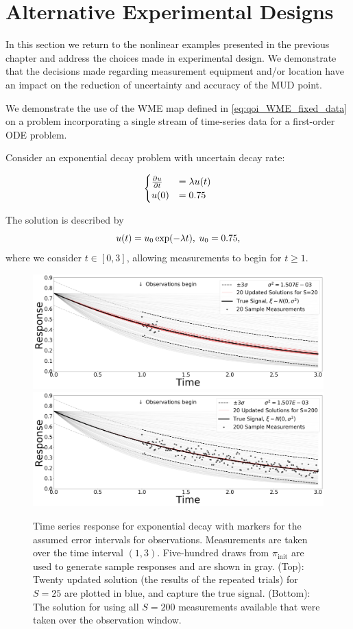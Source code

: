 \section{Alternative Experimental Designs}

In this section we return to the nonlinear examples presented in the previous chapter and address the choices made in experimental design.
We demonstrate that the decisions made regarding measurement equipment and/or location have an impact on the reduction of uncertainty and accuracy of the MUD point.

We demonstrate the use of the WME map defined in \eqref{eq:qoi_WME_fixed_data} on a problem incorporating a single stream of time-series data for a first-order ODE problem.

Consider an exponential decay problem with uncertain decay rate:

$$
\begin{cases}
\frac{\partial u}{\partial t} & = \lambda u(t) \\ u(0) &= 0.75
\end{cases}
$$

The solution is described by
\begin{equation}
  u(t) = u_0\exp(-\lambda t), \; u_0 = 0.75 ,
\end{equation}
where we consider $t \in [0, 3]$, allowing measurements to begin for $t\geq 1$.
\begin{figure}[htbp]
  \includegraphics[width=\linewidth]{figures/ode/ode_20_reference_solution}
  \includegraphics[width=\linewidth]{figures/ode/ode_200_reference_solution}
  \caption{Time series response for exponential decay with markers for the assumed error intervals for observations.
  Measurements are taken over the time interval $(1,3)$.
  Five-hundred draws from $\pi_\text{init}$ are used to generate sample responses and are shown in gray.
  (Top): Twenty updated solution (the results of the repeated trials) for $S=25$ are plotted in blue, and capture the true signal.
  (Bottom): The solution for using all $S=200$ measurements available that were taken over the observation window.
  }
  \label{fig:ode-reference}
\end{figure}

